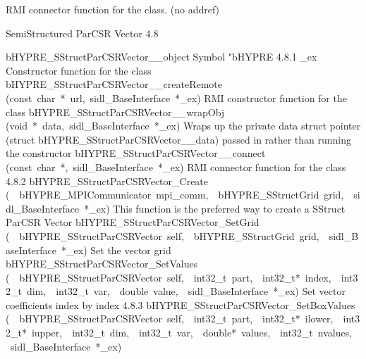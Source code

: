 \documentclass{article}
\begin{document}
\begin{cxxentry}
\begin{cxxentry}
\begin{cxxvariable}
\begin{cxxdoc}
RMI connector function for the class. (no addref)
\end{cxxdoc}
\end{cxxvariable}
\end{cxxentry}
\begin{cxxentry}
{}
        {SemiStructured ParCSR Vector}
        {}
        {
}
        {4.8}
\begin{cxxnames}
        {bHYPRE\_SStructParCSRVector\_\_object}
        {}
        {
Symbol "bHYPRE}
        {4.8.1}
        {\_ex}
        {}
        {
Constructor function for the class}
        {}
\label{cxx.4.8.16}
        {bHYPRE\_SStructParCSRVector\_\_createRemote}
        {(const\ char\ *\ url,\ sidl\_BaseInterface\ *\_ex)}
        {
RMI constructor function for the class}
        {}
\label{cxx.4.8.17}
        {bHYPRE\_SStructParCSRVector\_\_wrapObj}
        {(void\ *\ data,\ sidl\_BaseInterface\ *\_ex)}
        {
Wraps up the private data struct pointer (struct bHYPRE\_SStructParCSRVector\_\_data) passed in rather than running the constructor}
        {}
\label{cxx.4.8.18}
        {bHYPRE\_SStructParCSRVector\_\_connect}
        {(const\ char\ *,\ sidl\_BaseInterface\ *\_ex)}
        {
RMI connector function for the class}
        {4.8.2}
        {bHYPRE\_SStructParCSRVector\_Create}
        {(\ \ bHYPRE\_MPICommunicator\ mpi\_comm,\ \ bHYPRE\_SStructGrid\ grid,\ \ sidl\_BaseInterface\ *\_ex)}
        {
This function is the preferred way to create a SStruct ParCSR Vector}
        {}
\label{cxx.4.8.19}
        {bHYPRE\_SStructParCSRVector\_SetGrid}
        {(\ \ bHYPRE\_SStructParCSRVector\ self,\ \ bHYPRE\_SStructGrid\ grid,\ \ sidl\_BaseInterface\ *\_ex)}
        {
Set the vector grid}
        {}
\label{cxx.4.8.20}
        {bHYPRE\_SStructParCSRVector\_SetValues}
        {(\ \ bHYPRE\_SStructParCSRVector\ self,\ \ int32\_t\ part,\ \ int32\_t*\ index,\ \ int32\_t\ dim,\ \ int32\_t\ var,\ \ double\ value,\ \ sidl\_BaseInterface\ *\_ex)}
        {
Set vector coefficients index by index}
        {4.8.3}
        {bHYPRE\_SStructParCSRVector\_SetBoxValues}
        {(\ \ bHYPRE\_SStructParCSRVector\ self,\ \ int32\_t\ part,\ \ int32\_t*\ ilower,\ \ int32\_t*\ iupper,\ \ int32\_t\ dim,\ \ int32\_t\ var,\ \ double*\ values,\ \ int32\_t\ nvalues,\ \ sidl\_BaseInterface\ *\_ex)}

\end{cxxnames}
\end{cxxentry}
\end{cxxentry}
\end{document}
